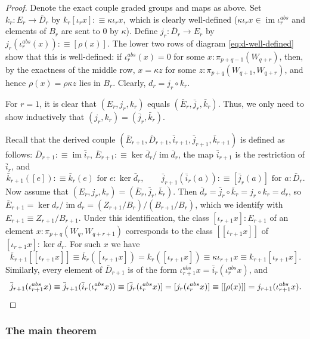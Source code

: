 \documentclass{amsart}
\theoremstyle{definition}
\newcommand{\im}{\operatorname{im}}
\begin{document}
\begin{proof}
    Denote the exact couple graded groups and maps as above.
    Set $k_r: E_r \to \bar{D}_r$ by $k_r[\iota_r x] :\equiv \kappa \iota_r x,$ which is clearly well-defined ($\kappa \iota_r x \in \im \iota_r^{abs}$ and elements of $B_r$ are sent to $0$ by $\kappa$).
    Define $j_r: \bar{D}_r \to E_r$ by $j_r (\iota^{abs}_r(x)) :\equiv [\rho (x)].$ The lower two rows of diagram \eqref{eq:d-well-defined} show that this is well-defined: if $\iota^{abs}_r(x) = 0$ for some $x : \pi_{p+q-1}(W_{q+r})$, then, by the exactness of the middle row, $x = \kappa z$ for some $z : \pi_{p+q}(W_{q+1}, W_{q+r})$, and hence $\rho(x) = \rho \kappa z$ lies in $B_r$. Clearly, $d_r = j_r \circ k_r.$

    For $r=1$, it is clear that $(E_r, j_r, k_r)$ equals $(\bar{E}_r, \bar{j}_r, \bar{k}_r)$. Thus, we only need to show inductively that $(j_r, k_r) = (\bar{j}_r, \bar{k}_r)$.

    Recall that the derived couple $(\bar{E}_{r+1}, \bar{D}_{r+1}, \bar{i}_{r+1}, \bar{j}_{r+1}, \bar{k}_{r+1})$ is defined as follows: $\bar{D}_{r+1} :\equiv \im \bar{i}_r$, $\bar{E}_{r+1} :\equiv \ker \bar{d}_r / \im \bar{d}_r$, the map $\bar{i}_{r+1}$ is the restriction of $\bar{i}_r$, and
    $$\bar{k}_{r+1}([e]) :\equiv \bar{k}_r(e) \text{ for } e : \ker \bar{d}_r, \qquad \bar{j}_{r+1}(\bar{i}_r(a)) :\equiv [\bar{j}_r(a)] \text{ for } a : \bar{D}_r.$$
    Now assume that $(E_r, j_r, k_r) = (\bar{E}_r, \bar{j}_r, \bar{k}_r)$. Then $\bar{d}_r = \bar{j}_r \circ \bar{k}_r = j_r \circ k_r = d_r$, so $\bar{E}_{r+1} = \ker d_r / \im d_r = (Z_{r+1}/B_r)/(B_{r+1}/B_r)$, which we identify with $E_{r+1} \equiv Z_{r+1}/B_{r+1}$. Under this identification, the class $[\iota_{r+1} x] : E_{r+1}$ of an element $x : \pi_{p+q}(W_q, W_{q+r+1})$ corresponds to the class $[[\iota_{r+1} x]]$ of $[\iota_{r+1} x] : \ker d_r$. For such $x$ we have
    $$\bar{k}_{r+1} [[\iota_{r+1}  x]] \equiv \bar{k}_r ([\iota_{r+1}  x]) = k_r ([\iota_{r+1} x]) \equiv \kappa \iota_{r+1} x \equiv k_{r+1}[\iota_{r+1} x].$$
    Similarly, every element of $\bar{D}_{r+1}$ is of the form $\iota^{abs}_{r+1} x = \bar{i}_r (\iota^{abs}_{r} x)$, and
    \[\bar{j}_{r+1} (\iota^{abs}_{r+1} x) \equiv \bar{j}_{r+1}  (\bar{i}_r (\iota^{abs}_{r} x)) \equiv [\bar{j}_{r} (\iota^{abs}_{r} x)] = [{j}_{r} (\iota_{r}^{abs} x)] \equiv [[\rho (x)]] = {j}_{r+1} (\iota^{abs}_{r+1} x). \qedhere\]
\end{proof}

\subsubsection{The main theorem}
\end{document}
